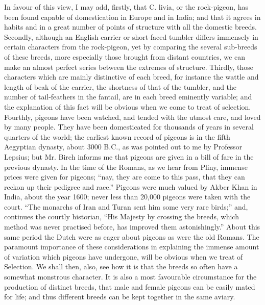 \documentclass{book}
\begin{document}
In favour of this view, I may add, firstly, that C. livia, or the rock-pigeon,
has been found capable of domestication in Europe and in India; and that it
agrees in habits and in a great number of points of structure with all the
domestic breeds. Secondly, although an English carrier or short-faced tumbler
differs immensely in certain characters from the rock-pigeon, yet by comparing
the several sub-breeds of these breeds, more especially those brought from
distant countries, we can make an almost perfect series between the extremes of
structure. Thirdly, those characters which are mainly distinctive of each
breed, for instance the wattle and length of beak of the carrier, the shortness
of that of the tumbler, and the number of tail-feathers in the fantail, are in
each breed eminently variable; and the explanation of this fact will be obvious
when we come to treat of selection. Fourthly, pigeons have been watched, and
tended with the utmost care, and loved by many people. They have been
domesticated for thousands of years in several quarters of the world; the
earliest known record of pigeons is in the fifth Aegyptian dynasty, about 3000
B.C., as was pointed out to me by Professor Lepsius; but Mr. Birch informs me
that pigeons are given in a bill
of fare in the previous dynasty. In the time of the Romans, as we hear from
Pliny, immense prices were given for pigeons; ``nay, they are come to this
pass, that they can reckon up their pedigree and race.'' Pigeons were much
valued by Akber Khan in India, about the year 1600; never less than 20,000
pigeons were taken with the court. ``The monarchs of Iran and Turan sent
him some very rare birds;'' and, continues the courtly historian,
``His Majesty by crossing the breeds, which method was never practised
before, has improved them astonishingly.'' About this same period the
Dutch were as eager about pigeons as were the old Romans. The paramount
importance of these considerations in explaining the immense amount of
variation which pigeons have undergone, will be obvious when we treat of
Selection. We shall then, also, see how it is that the breeds so often have a
somewhat monstrous character. It is also a most favourable circumstance for the
production of distinct breeds, that male and female pigeons can be easily mated
for life; and thus different breeds can be kept together in the same aviary.
\end{document}
